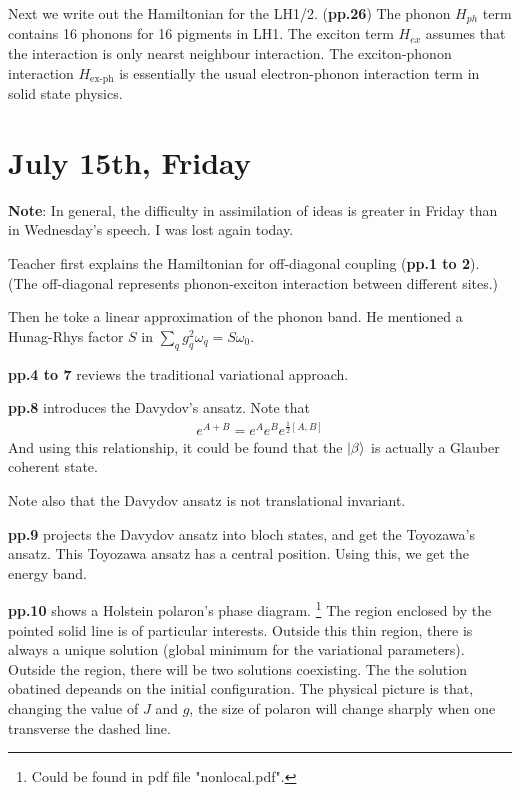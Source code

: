 \documentclass{article}
\numberwithin{equation}{subsection} %
\theoremstyle{definition}
\begin{document}
Next we write out the Hamiltonian for the LH1/2. (\textbf{pp.26})
The phonon $H_{ph}$ term 
contains 16 phonons for 16 pigments in LH1. The exciton term $H_{ex}$
assumes that the interaction is only nearst neighbour interaction.
The exciton-phonon interaction $H_{\text{ex-ph}}$ is essentially
the usual electron-phonon interaction term in solid state physics.
\section{July 15th, Friday}
\label{sec:July_15}

\textbf{Note}: In general, the difficulty in assimilation of ideas is
greater in Friday than in Wednesday's speech. I was lost again today. 

Teacher first explains the Hamiltonian for off-diagonal coupling
(\textbf{pp.1 to 2}). (The off-diagonal represents phonon-exciton
interaction between different sites.)

Then he toke a linear approximation of the phonon band. He mentioned
a Hunag-Rhys factor $S$ in $\sum_q g_q^2 \omega_q = S\omega_0$.

\textbf{pp.4 to 7} reviews the traditional variational approach.

\textbf{pp.8} introduces the Davydov's ansatz.
Note that
\begin{align*}
    e^{A+B} = e^A e^B e^{\frac{1}{2}[A,B]}
\end{align*}
And using this relationship, it could be found that the $\ket{\beta}$
is actually a Glauber coherent state.

Note also that the Davydov ansatz is not translational invariant. 

\textbf{pp.9} projects the Davydov ansatz into bloch states, and get
the Toyozawa's ansatz. This Toyozawa ansatz has a central
position. Using this, we get the energy band.

\textbf{pp.10 }shows a Holstein polaron's phase diagram. 
\footnote{Could be found in pdf file "nonlocal.pdf".}
The region enclosed by the pointed solid line is of particular
interests. Outside this thin region,
there is always a unique solution (global minimum for the variational
parameters). 
Outside the region, there will be two solutions coexisting.
The the solution obatined depeands on the initial configuration.
The physical picture is that, changing the value of $J$ and $g$,
the size of polaron will change sharply when one transverse the
dashed line.
\end{document}
